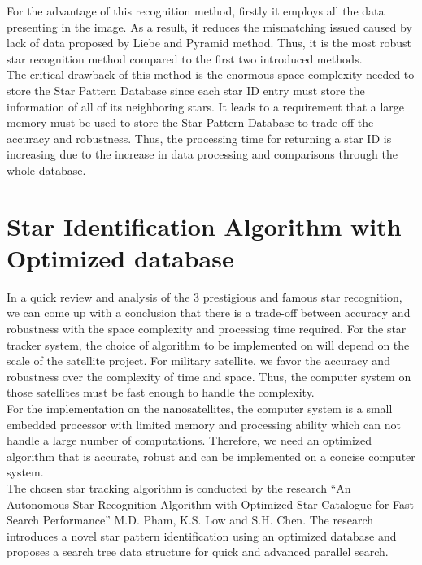 \noindent For the advantage of this recognition method, firstly it employs all the data presenting in the image. As a result, it reduces the mismatching issued caused by lack of data proposed by Liebe and Pyramid method. Thus, it is the most robust star recognition method compared to the first two introduced methods. \\

\noindent The critical drawback of this method is the enormous space complexity needed to store the Star Pattern Database since each star ID entry must store the information of all of its neighboring stars. It leads to a requirement that a large memory must be used to store the Star Pattern Database to trade off the accuracy and robustness. Thus, the processing time for returning a star ID is increasing due to the increase in data processing and comparisons through the whole database.

\section{Star Identification Algorithm with Optimized database}

In a quick review and analysis of the 3 prestigious and famous star recognition, we can come up with a conclusion that there is a trade-off between accuracy and robustness with the space complexity and processing time required. For the star tracker system, the choice of algorithm to be implemented on will depend on the scale of the satellite project. For military satellite, we favor the accuracy and robustness over the complexity of time and space. Thus, the computer system on those satellites must be fast enough to handle the complexity. \\

\noindent For the implementation on the nanosatellites, the computer system is a small embedded processor with limited memory and processing ability which can not handle a large number of computations. Therefore, we need an optimized algorithm that is accurate, robust and can be implemented on a concise computer system. \\

\noindent The chosen star tracking algorithm is conducted by the research “An Autonomous Star Recognition Algorithm with Optimized Star Catalogue for Fast Search Performance” M.D. Pham, K.S. Low and S.H. Chen\cite{edselc.2-52.0-8487677997120120101,edseee.655799920130101}. The research introduces a novel star pattern identification using an optimized database and proposes a search tree data structure for quick and advanced parallel search. \\

